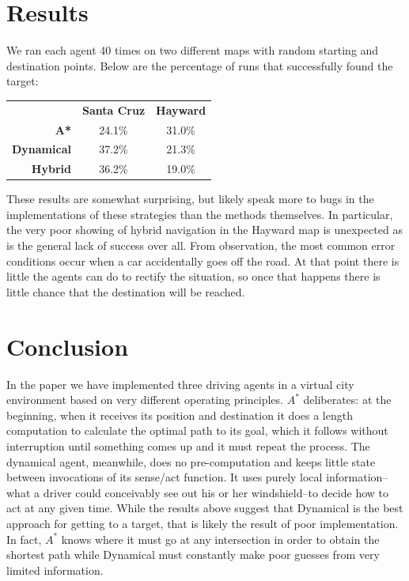 \documentclass{article}
\begin{document}
\section{Results}
We ran each agent 40 times on two different maps with random starting
and destination points. Below are the percentage of runs that
successfully found the target:

\begin{tabular}[c]{rcc}
  & \textbf{Santa Cruz} & \textbf{Hayward} \\
\textbf{A*} & 24.1\% & 31.0\% \\
\textbf{Dynamical} & 37.2\% & 21.3\% \\
\textbf{Hybrid} & 36.2\% & 19.0\%
\end{tabular}

These results are somewhat surprising, but likely speak more to bugs
in the implementations of these strategies than the methods
themselves. In particular, the very poor showing of hybrid navigation
in the Hayward map is unexpected as is the general lack of success
over all. From observation, the most common error conditions occur
when a car accidentally goes off the road. At that point there is
little the agents can do to rectify the situation, so once that
happens there is little chance that the destination will be reached.

\section{Conclusion}
In the paper we have implemented three driving agents in a virtual
city environment based on very different operating principles. $A^*$
deliberates: at the beginning, when it receives its position and
destination it does a length computation to calculate the optimal path
to its goal, which it follows without interruption until something
comes up and it must repeat the process. The dynamical agent,
meanwhile, does no pre-computation and keeps little state between
invocations of its sense/act function. It uses purely local
information--what a driver could conceivably see out his or her
windshield--to decide how to act at any given time. While the results
above suggest that Dynamical is the best approach for getting to a
target, that is likely the result of poor implementation. In fact, $A^*$
knows where it must go at any intersection in order to obtain the
shortest path while Dynamical must constantly make poor guesses from
very limited information.
\end{document}
